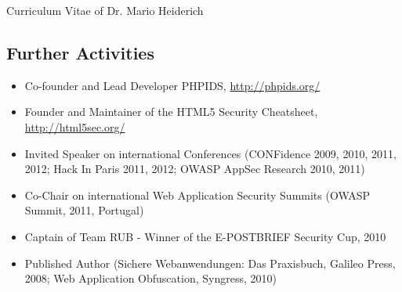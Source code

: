 \begin{cv}{Curriculum Vitae of Dr. Mario Heiderich}
\subsection*{Further Activities}
\begin{itemize}
  \item Co-founder and Lead Developer PHPIDS, \url{http://phpids.org/}
  \item Founder and Maintainer of the HTML5 Security Cheatsheet, \url{http://html5sec.org/}
  \item Invited Speaker on international Conferences (CONFidence 2009, 2010, 2011, 2012; Hack In Paris 2011, 2012; OWASP AppSec Research 2010, 2011)
  \item Co-Chair on international Web Application Security Summits (OWASP Summit, 2011, Portugal)
  \item Captain of Team RUB - Winner of the E-POSTBRIEF Security Cup, 2010
  \item Published Author (Sichere Webanwendungen: Das Praxisbuch, Galileo Press, 2008; Web Application Obfuscation, Syngress, 2010)
\end{itemize}

\end{cv}